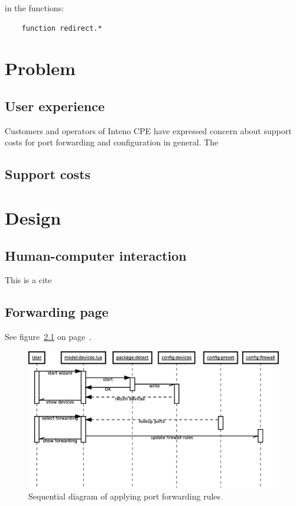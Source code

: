 \documentclass[a4paper,11pt]{kth-bcs}
\begin{document}
in the functions:

\begin{verbatim}
    function redirect.*
\end{verbatim}

\chapter{Problem}
   \section{User experience}
Customers and operators of Inteno CPE have expressed concern about support costs for port forwarding and configuration in general.
The 

   \section{Support costs}

\chapter{Design}
   \section{Human-computer interaction}
This is a cite\cite{garrett2003elements}

   \section{Forwarding page}

See figure~\ref{fig:wizard-seq_dia} on page~\pageref{fig:wizard-seq_dia}.
\begin{figure}[h!]
   \centering
   \includegraphics[width=15cm]{wizard-seq_dia}
   \caption{Sequential diagram of applying port forwarding rules}
   \label{fig:wizard-seq_dia}
\end{figure}
\end{document}
